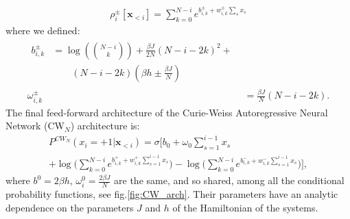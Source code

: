 \documentclass[aps,physrev,10pt,floatfix,reprint]{revtex4-2}
\begin{document}
 \begin{eqnarray*}
 \rho_i^{\pm}[\mathbf{x}_{<i}] = \sum_{k=0}^{N-i} e^{b_{i,k}^{\pm} + w_{i,k}^{\pm} \sum_s x_s} 
\end{eqnarray*}
where we defined:
\begin{align}
\label{eq:params}
\begin{split}
b_{i,k}^{\pm} & = \log\left(\binom{N-i}{k}\right) + \frac{\beta J}{2N}\left(N-i-2k\right)^{2}+ \\
& \qquad \left(N-i-2k\right)\left(\beta h \pm \frac{\beta J}{N}\right)
\end{split} \\
\omega_{i,k}^{\pm} & = \frac{\beta J}{N}\left(N-i-2k\right).
\label{eq:CW_params}
\end{align}
The final feed-forward architecture of the Curie-Weiss Autoregressive Neural Network (CW$_N$) architecture is:
\begin{multline*}
P^{CW_{N}}\left(x_{i}=+1|\mathbf{x}_{<i}\right)  =   \sigma \bigg[b_{0}+\omega_{0}\sum_{s=1}^{i-1}x_{s} \\
 + \log\big(\sum_{k=0}^{N-i}e^{b_{i,k}^{+} + 
w_{i,k}^{+}\sum_{s=1}^{i-1}x_{s}}\big)-\log\big(\sum_{k=0}^{N-i}e^{b_{i,k}^{-} + w_{i,k}^{-}\sum_{s=1}^{i-1}x_{s}}\big)\bigg],
\end{multline*}
where $b^0=2\beta h$, $\omega^0_i = \frac{2\beta J}{N}$ are the same, and so shared, among all the conditional probability functions, see fig.\ref{fig:CW_arch}. Their parameters have an analytic dependence on the parameters $J$ and $h$ of the Hamiltonian of the systems. 
\end{document}
